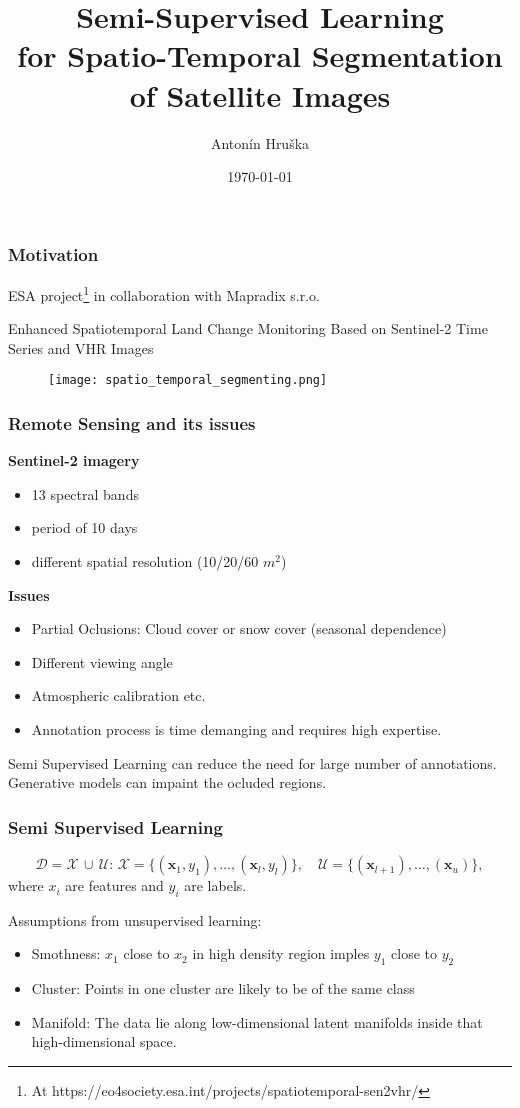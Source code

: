 \documentclass[11pt]{beamer}
\title{Semi-Supervised Learning \\for Spatio-Temporal Segmentation of Satellite Images}
\author{Antonín Hruška}
\date{\today}
\begin{document}
\maketitle

\begin{frame}
    \frametitle{Motivation}
    ESA project\footnote{At https://eo4society.esa.int/projects/spatiotemporal-sen2vhr/} in collaboration with Mapradix s.r.o.

    Enhanced Spatiotemporal Land Change Monitoring Based on Sentinel-2 Time Series and VHR Images

    \begin{figure}[b]
        \centering
        \texttt{[image: spatio\_temporal\_segmenting.png]}
    \end{figure}

\end{frame}


\begin{frame}
    \frametitle{Remote Sensing and its issues}
    \textbf{Sentinel-2 imagery}
    \begin{itemize}
        \item 13 spectral bands
        \item period of 10 days
        \item different spatial resolution (10/20/60 $m^2$)
    \end{itemize} 
    \textbf{Issues}
    \begin{itemize}
        \item Partial Oclusions: Cloud cover or snow cover (seasonal dependence)
        \item Different viewing angle
        \item Atmospheric calibration etc. 
        \item Annotation process is time demanging and requires high expertise.
    \end{itemize}

    Semi Supervised Learning can reduce the need for large number of annotations.
    Generative models can impaint the ocluded regions. 
\end{frame}


\begin{frame}
    \frametitle{Semi Supervised Learning}
    $$
    \mathcal{D} = \mathcal{X}\,\cup\,\mathcal{U}:\, \mathcal{X} = \{(\mathbf{x}_1,y_1),\dots, (\mathbf{x}_l,y_l)\},\quad \mathcal{U} = \{(\mathbf{x}_{l+1}),\dots,(\mathbf{x}_{u})\},
    $$
    where $x_i$ are features and $y_i$ are labels. 
    
    Assumptions from unsupervised learning: 
    \begin{itemize}
        \item Smothness: $x_1$ close to $x_2$ in high density region imples $y_1$ close to $y_2$
        \item Cluster: Points in one cluster are likely to be of the same class
        \item Manifold: The data lie along low-dimensional latent manifolds inside that high-dimensional space.
    \end{itemize}
\end{frame}
\end{document}
